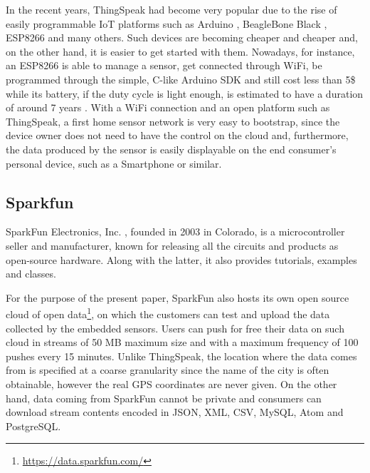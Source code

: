 In the recent years, ThingSpeak had become very popular due to the rise of easily programmable IoT platforms such as Arduino \cite{arduino}, BeagleBone Black \cite{bbblack}, ESP8266 \cite{esp8266} and many others.
Such devices are becoming cheaper and cheaper and, on the other hand, it is easier to get started with them.
Nowadays, for instance, an ESP8266 is able to manage a sensor, get connected through WiFi, be programmed through the simple, C-like Arduino SDK and still cost less than 5\$ while its battery, if the duty cycle is light enough, is estimated to have a duration of around 7 years \cite{di2015design}.
With a WiFi connection and an open platform such as ThingSpeak, a first home sensor network is very easy to bootstrap, since the device owner does not need to have the control on the cloud and, furthermore, the data produced by the sensor is easily displayable on the end consumer's personal device, such as a Smartphone or similar.

\subsection{Sparkfun}
SparkFun Electronics, Inc. \cite{sparkfun}, founded in 2003 in Colorado, is a microcontroller seller and manufacturer, known for releasing all the circuits and products as open-source hardware. \color{red} Along with the latter, it also provides\color{black} tutorials, examples and classes.

For the purpose of the present paper, SparkFun also hosts its own open source cloud of open data\footnote{\url{https://data.sparkfun.com/}}, on which the customers can test and upload the data collected by the embedded sensors. %
Users can push for free their data on such cloud in streams of 50 MB maximum size and with a maximum frequency of 100 pushes every 15 minutes.
Unlike ThingSpeak, the location where the data comes from is specified at a coarse granularity since the name of the city is often obtainable, however the real GPS coordinates are never given.
On the other hand, data coming from SparkFun cannot be private and consumers can download stream contents encoded in JSON, XML, CSV, MySQL, Atom and PostgreSQL.